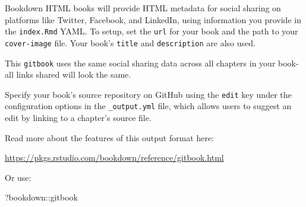 \documentclass[
]{book}
\newenvironment{Shaded}{\begin{snugshade}}{\end{snugshade}}
\newcommand{\NormalTok}[1]{#1}
\newcommand{\SpecialCharTok}[1]{\textcolor[rgb]{0.00,0.00,0.00}{#1}}
\begin{document}
Bookdown HTML books will provide HTML metadata for social sharing on platforms like Twitter, Facebook, and LinkedIn, using information you provide in the \texttt{index.Rmd} YAML. To setup, set the \texttt{url} for your book and the path to your \texttt{cover-image} file. Your book's \texttt{title} and \texttt{description} are also used.

This \texttt{gitbook} uses the same social sharing data across all chapters in your book- all links shared will look the same.

Specify your book's source repository on GitHub using the \texttt{edit} key under the configuration options in the \texttt{\_output.yml} file, which allows users to suggest an edit by linking to a chapter's source file.

Read more about the features of this output format here:

\url{https://pkgs.rstudio.com/bookdown/reference/gitbook.html}

Or use:

\begin{Shaded}
\begin{Highlighting}[]
\NormalTok{?bookdown}\SpecialCharTok{::}\NormalTok{gitbook}
\end{Highlighting}
\end{Shaded}


  
\end{document}
